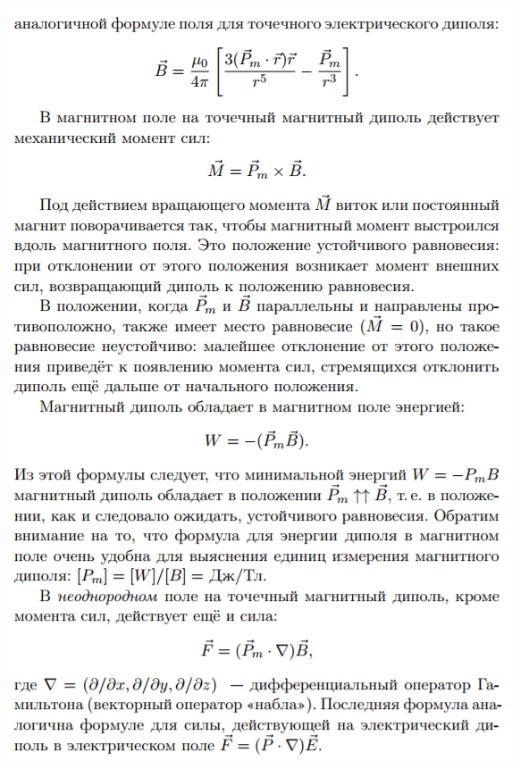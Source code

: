 \documentclass[12pt]{article}
\begin{document}
\begin{center}
	    \includegraphics[width=15cm]{theory11.png}

\end{center}
\end{document}
